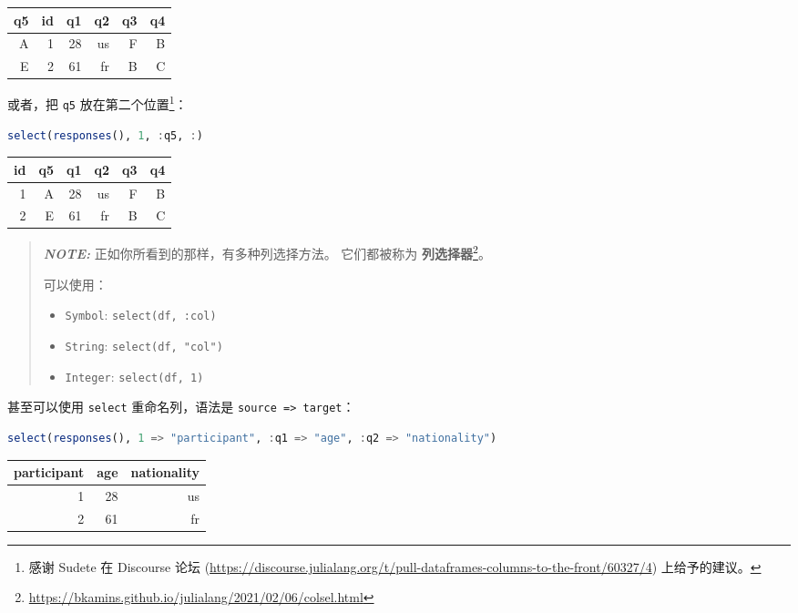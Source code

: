 \documentclass[
  notoc %
]{tufte-book}
\DeclareRobustCommand{\href}[2]{#2\footnote{\url{#1}}}
\newcommand{\passthrough}[1]{#1}
\begin{document}
\begin{longtable}[]{@{}rrrrrr@{}}
\toprule
q5 & id & q1 & q2 & q3 & q4 \\
\midrule
\endhead
A & 1 & 28 & us & F & B \\
E & 2 & 61 & fr & B & C \\
\bottomrule
\end{longtable}

或者，把 \passthrough{\lstinline!q5!} 放在第二个位置\footnote{感谢
  Sudete 在 Discourse 论坛
  (\url{https://discourse.julialang.org/t/pull-dataframes-columns-to-the-front/60327/4})
  上给予的建议。}：

\begin{lstlisting}[language=Julia]
select(responses(), 1, :q5, :)
\end{lstlisting}

\begin{longtable}[]{@{}rrrrrr@{}}
\toprule
id & q5 & q1 & q2 & q3 & q4 \\
\midrule
\endhead
1 & A & 28 & us & F & B \\
2 & E & 61 & fr & B & C \\
\bottomrule
\end{longtable}

\begin{quote}
\textbf{\emph{NOTE:}} 正如你所看到的那样，有多种列选择方法。
它们都被称为
\href{https://bkamins.github.io/julialang/2021/02/06/colsel.html}{\textbf{列选择器}}。

可以使用：

\begin{itemize}
\item
  \passthrough{\lstinline!Symbol!}:
  \passthrough{\lstinline!select(df, :col)!}
\item
  \passthrough{\lstinline!String!}:
  \passthrough{\lstinline!select(df, "col")!}
\item
  \passthrough{\lstinline!Integer!}:
  \passthrough{\lstinline!select(df, 1)!}
\end{itemize}
\end{quote}

甚至可以使用 \passthrough{\lstinline!select!} 重命名列，语法是
\passthrough{\lstinline!source => target!}：

\begin{lstlisting}[language=Julia]
select(responses(), 1 => "participant", :q1 => "age", :q2 => "nationality")
\end{lstlisting}

\begin{longtable}[]{@{}rrr@{}}
\toprule
participant & age & nationality \\
\midrule
\endhead
1 & 28 & us \\
2 & 61 & fr \\
\bottomrule
\end{longtable}
\end{document}
